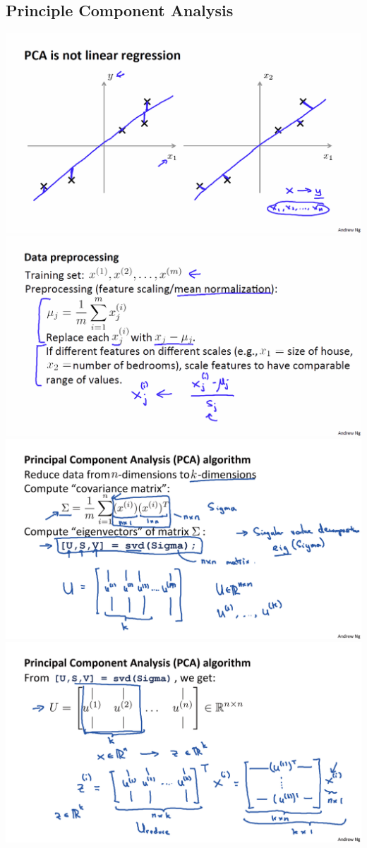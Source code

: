 \documentclass[10pt,landscape, fleqn]{article}
\begin{document}
\begin{multicols}{3}
		\section{Principle Component Analysis}
			\begin{center}
				\includegraphics[width=0.95\linewidth]{pca1}
				\includegraphics[width=0.95\linewidth]{pca2}
				\includegraphics[width=0.95\linewidth]{pca3}
				\includegraphics[width=0.95\linewidth]{pca4}

\end{center}
\end{multicols}
\end{document}
